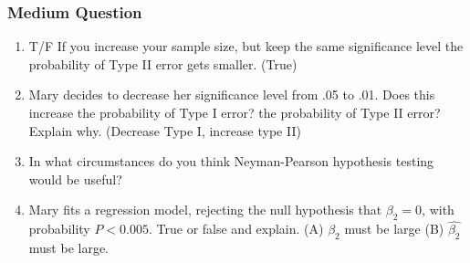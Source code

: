 \documentclass[11pt]{article}
\begin{document}
\subsubsection{Medium Question}
\begin{enumerate}
\item T/F If you increase your sample size, but keep the same significance level the probability of Type II error gets smaller. (True) 
\item Mary decides to decrease her significance level from .05 to .01.  Does this increase the probability of Type I error?  the probability of Type II error?  Explain why. (Decrease Type I, increase type II) 
\item In what circumstances do you think Neyman-Pearson hypothesis testing would be useful? 
\item Mary fits a regression model, rejecting the null hypothesis that $\beta_2=0$, with probability $P<0.005$.  True or false and explain.  (A) $\beta_2$ must be large (B) $\hat{\beta_2}$ must be large.  
\end{enumerate}
\end{document}
